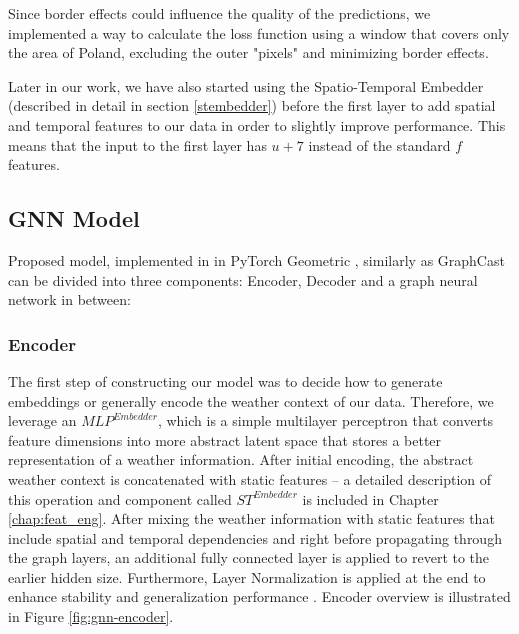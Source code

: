Since border effects could influence the quality of the predictions, we implemented a way to
calculate the loss function using a window that covers only the area of Poland, excluding the outer "pixels" and minimizing border effects.

Later in our work, we have also started using the Spatio-Temporal Embedder (described in detail in section \ref{stembedder})  before the first layer to add spatial and temporal features to our data in order to slightly improve performance. This means that the input to the first layer has $u + 7$ instead of the standard $f$ features.

\subsection{GNN Model}\label{chap:model}
Proposed model, implemented in in PyTorch Geometric \cite{fey2019fast}, similarly as GraphCast can be divided into three components: Encoder, Decoder and a graph neural network in between:



\subsubsection{Encoder}
The first step of constructing our model was to decide how to generate embeddings or generally encode the weather context of our data. Therefore, we leverage an $MLP^{Embedder}$, which is a simple multilayer perceptron that converts feature dimensions into more abstract latent space that stores a better representation of a weather information. After initial encoding, the abstract weather context is concatenated with static features -- a detailed description of this operation and component called $ST^{Embedder}$ is included in Chapter \ref{chap:feat_eng}. After mixing the weather information with static features that include spatial and temporal dependencies and right before propagating through the graph layers, an additional fully connected layer is applied to revert to the earlier hidden size. Furthermore, Layer Normalization is applied at the end to enhance stability and generalization performance \cite{ba2016layer}. Encoder overview is illustrated in Figure \ref{fig:gnn-encoder}.

